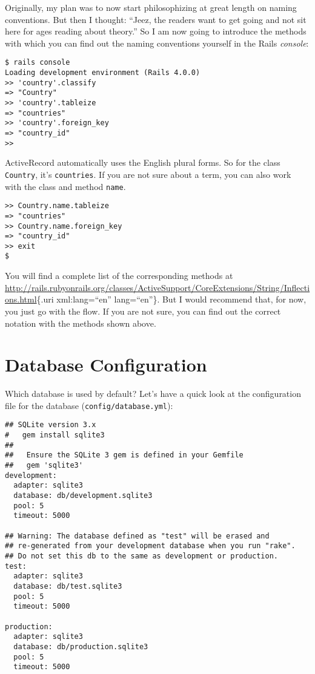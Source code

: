 \documentclass[a4paper]{book}
\newcounter{tab}[chapter]
\begin{document}
Originally, my plan was to now start philosophizing at great length on naming conventions. But then I thought: “Jeez, the readers want to get going and not sit here for ages reading about theory.” So I am now going to introduce the methods with which you can find out the naming conventions yourself in the Rails \emph{console}:

\begin{shaded}\begin{verbatim}
$ rails console
Loading development environment (Rails 4.0.0)
>> 'country'.classify
=> "Country"
>> 'country'.tableize
=> "countries"
>> 'country'.foreign_key
=> "country_id"
>>
\end{verbatim}\end{shaded}

ActiveRecord automatically uses the English plural forms. So for the class \texttt{Country}, it's \texttt{countries}. If you are not sure about a term, you can also work with the class and method \texttt{name}.

\begin{shaded}\begin{verbatim}
>> Country.name.tableize
=> "countries"
>> Country.name.foreign_key
=> "country_id"
>> exit
$
\end{verbatim}\end{shaded}

You will find a complete list of the corresponding methods at \url{http://rails.rubyonrails.org/classes/ActiveSupport/CoreExtensions/String/Inflections.html}\{.uri xml:lang=“en” lang=“en”\}. But I would recommend that, for now, you just go with the flow. If you are not sure, you can find out the correct notation with the methods shown above.

\section{Database Configuration}\label{database-configuration}

Which database is used by default? Let's have a quick look at the configuration file for the database (\texttt{config/database.yml}):

\begin{shaded}\begin{verbatim}
## SQLite version 3.x
#   gem install sqlite3
##
##   Ensure the SQLite 3 gem is defined in your Gemfile
##   gem 'sqlite3'
development:
  adapter: sqlite3
  database: db/development.sqlite3
  pool: 5
  timeout: 5000

## Warning: The database defined as "test" will be erased and
## re-generated from your development database when you run "rake".
## Do not set this db to the same as development or production.
test:
  adapter: sqlite3
  database: db/test.sqlite3
  pool: 5
  timeout: 5000

production:
  adapter: sqlite3
  database: db/production.sqlite3
  pool: 5
  timeout: 5000
\end{verbatim}\end{shaded}
\end{document}
